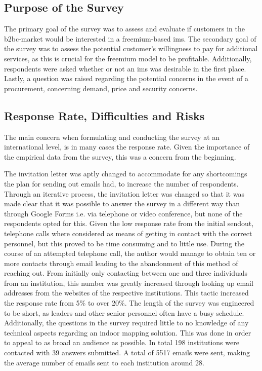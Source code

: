 \subsection{Purpose of the Survey}
The primary goal of the survey was to assess and evaluate if customers in the \gls{b2bc}-market would be interested in a freemium-based \gls{ims}. The secondary goal of the survey was to assess the potential customer's willingness to pay for additional services, as this is crucial for the freemium model to be profitable. Additionally, respondents were asked whether or not an \gls{ims} was desirable in the first place. Lastly, a question was raised regarding the potential concerns in the event of a procurement, concerning demand, price and security concerns.

\subsection{Response Rate, Difficulties and Risks}
The main concern when formulating and conducting the survey at an international level, is in many cases the response rate. Given the importance of the empirical data from the survey, this was a concern from the beginning. 


The invitation letter was aptly changed to accommodate for any shortcomings the plan for sending out emails had, to increase the number of respondents. Through an iterative process, the invitation letter was changed so that it was made clear that it was possible to answer the survey in a different way than through Google Forms i.e. via telephone or video conference, but none of the respondents opted for this. Given the low response rate from the initial sendout, telephone calls where considered as means of getting in contact with the correct personnel, but this proved to be time consuming and to little use. During the course of an attempted telephone call, the author would manage to obtain ten or more contacts through email leading to the abandonment of this method of reaching out. From initially only contacting between one and three individuals from an institution, this number was greatly increased through looking up email addresses from the websites of the respective institutions. This tactic increased the response rate from 5\% to over 20\%.  The length of the survey was engineered to be short, as leaders and other senior personnel often have a busy schedule. Additionally, the questions in the survey required little to no knowledge of any technical aspects regarding an indoor mapping solution. This was done in order to appeal to as broad an audience as possible. In total 198 institutions were contacted with 39 answers submitted. A total of 5517 emails were sent, making the average number of emails sent to each institution around 28. 

